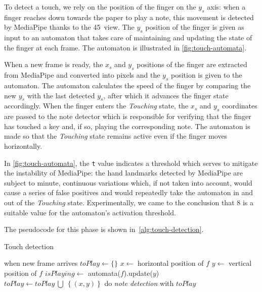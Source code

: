 To detect a touch, we rely on the position of the finger on the $y_s$ axis: when a finger reaches
down towards the paper to play a note, this movement is detected by MediaPipe thanks to the 45\degree \ view.
The $y_s$ position of the finger is given as input to an automaton that takes care
of maintaining and updating the state of the finger at each frame.
The automaton is illustrated in \autoref{fig:touch-automata}.

When a new frame is ready, the $x_s$ and $y_s$ positions of the finger are extracted from MediaPipe
and converted into pixels and the $y_s$ position is given to the automaton.
The automaton calculates the speed of the finger by comparing the new $y_s$ with the last detected $y_s$,
after which it advances the finger state accordingly.
When the finger enters the \textit{Touching} state, the $x_s$ and $y_s$ coordinates are passed to the note detector
which is responsible for verifying that the finger has touched a key and, if so, playing the corresponding note.
The automaton is made so that the \textit{Touching} state remains active even if the finger moves horizontally.

In \autoref{fig:touch-automata}, the \texttt{t} value indicates a threshold which serves to mitigate the instability of MediaPipe:
the hand landmarks detected by MediaPipe are subject to minute, continuous variations which, if not taken into account,
would cause a series of false positives and would repeatedly take the automaton in and out of the \textit{Touching} state.
Experimentally, we came to the conclusion that 8 is a suitable value for the automaton's activation threshold.

The pseudocode for this phase is shown in~\autoref{alg:touch-detection}.

\begin{algorithm}
	\caption{Touch detection}
	\begin{algorithmic}[1]
		\State when new frame arrives
			\State \Return
		\EndIf
		\State $toPlay \gets \{\}$
				\State $x \gets$ horizontal position of $f$
				\State $y \gets$ vertical position of $f$
				\State $isPlaying \gets$ automata($f$).update($y$)
					\State $toPlay \gets toPlay \ \bigcup \ \left\{ \left( x, y \right) \right\}$
				\EndIf
			\EndFor
		\EndFor
		\State do \textit{note detection} with $toPlay$
	\end{algorithmic}
	\label{alg:touch-detection}
\end{algorithm}

